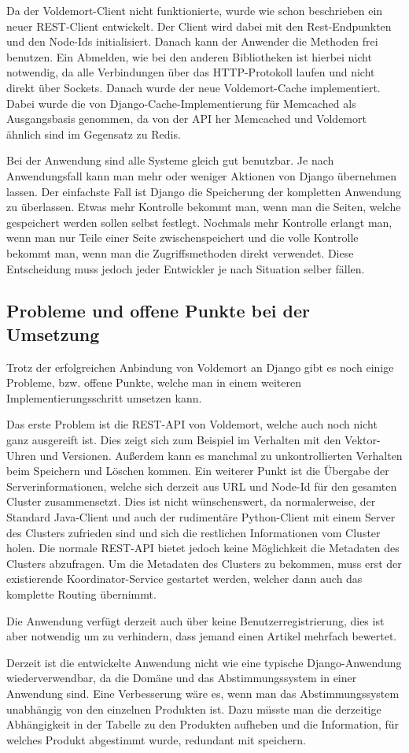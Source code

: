 Da der Voldemort-Client nicht funktionierte, wurde wie schon beschrieben ein
neuer REST-Client entwickelt. Der Client wird dabei mit den Rest-Endpunkten und
den Node-Ids initialisiert. Danach kann der Anwender die Methoden frei benutzen.
Ein Abmelden, wie bei den anderen Bibliotheken ist hierbei nicht notwendig, da
alle Verbindungen über das HTTP-Protokoll laufen und nicht direkt über Sockets.
Danach wurde der neue Voldemort-Cache implementiert. Dabei wurde die von
Django-Cache-Implementierung für Memcached als Ausgangsbasis genommen, da von
der API her Memcached und Voldemort ähnlich sind im Gegensatz zu Redis.

Bei der Anwendung sind alle Systeme gleich gut benutzbar. Je nach Anwendungsfall
kann man mehr oder weniger Aktionen von Django übernehmen lassen. Der einfachste
Fall ist Django die Speicherung der kompletten Anwendung zu überlassen. Etwas
mehr Kontrolle bekommt man, wenn man die Seiten, welche gespeichert werden
sollen selbst festlegt. Nochmals mehr Kontrolle erlangt man, wenn man nur Teile
einer Seite zwischenspeichert und die volle Kontrolle bekommt man, wenn man die
Zugriffsmethoden direkt verwendet. Diese Entscheidung muss jedoch jeder
Entwickler je nach Situation selber fällen.

\subsection{Probleme und offene Punkte bei der Umsetzung}
Trotz der erfolgreichen Anbindung von Voldemort an Django gibt es noch einige
Probleme, bzw. offene Punkte, welche man in einem weiteren
Implementierungsschritt umsetzen kann.

Das erste Problem ist die REST-API von Voldemort, welche auch noch nicht ganz
ausgereift ist. Dies zeigt sich zum Beispiel im Verhalten mit den Vektor-Uhren
und Versionen. Außerdem kann es manchmal zu unkontrollierten Verhalten beim
Speichern und Löschen kommen. Ein weiterer Punkt ist die Übergabe der
Serverinformationen, welche sich derzeit aus URL und Node-Id für den gesamten
Cluster zusammensetzt. Dies ist nicht wünschenswert, da normalerweise, der
Standard Java-Client und auch der rudimentäre Python-Client mit einem Server
des Clusters zufrieden sind und sich die restlichen Informationen vom Cluster
holen. Die normale REST-API bietet jedoch keine Möglichkeit die Metadaten des
Clusters abzufragen. Um die Metadaten des Clusters zu bekommen, muss erst der
existierende Koordinator-Service gestartet werden, welcher dann auch das
komplette Routing übernimmt.

Die Anwendung verfügt derzeit auch über keine Benutzerregistrierung, dies ist
aber notwendig um zu verhindern, dass jemand einen Artikel mehrfach bewertet.

Derzeit ist die entwickelte Anwendung nicht wie eine typische Django-Anwendung
wiederverwendbar, da die Domäne und das Abstimmungssystem in einer Anwendung sind.
Eine Verbesserung wäre es, wenn man das Abstimmungssystem unabhängig von den
einzelnen Produkten ist. Dazu müsste man die derzeitige Abhängigkeit in der
Tabelle zu den Produkten aufheben und die Information, für welches Produkt
abgestimmt wurde, redundant mit speichern.
